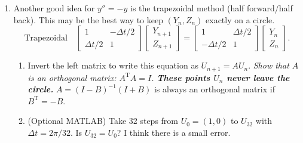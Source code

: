 \documentclass[14pt, a4paper]{article}
\begin{document}
\begin{enumerate}[resume]
    \item Another good idea for $y'' = -y$ is the trapezoidal method (half forward/half back). \textcolor{blue!60!green}{This may be the best way to keep $(Y_n, Z_n)$ exactly on a circle.}
          \[
              \text{Trapezoidal} \quad \begin{bmatrix} 1 & -\Delta t/2 \\ \Delta t/2 & 1 \end{bmatrix} \begin{bmatrix} Y_{n+1} \\ Z_{n+1} \end{bmatrix} = \begin{bmatrix} 1 & \Delta t/2 \\ -\Delta t/2 & 1 \end{bmatrix} \begin{bmatrix} Y_n \\ Z_n \end{bmatrix} .
          \]
          \begin{enumerate}
              \item Invert the left matrix to write this equation as $U_{n+1} = AU_n$. \textit{Show that $A$ is an orthogonal matrix: $A^{\mathrm{T}}A = I$. \textbf{These points $U_n$ never leave the circle.}} $A = (I - B)^{-1}(I + B)$ is always an orthogonal matrix if $B^{\mathrm{T}} = -B$.
              \item (Optional MATLAB) Take 32 steps from $U_0 = (1, 0)$ to $U_{32}$ with $\Delta t = 2\pi/32$. Is $U_{32} = U_0$? I think there is a small error.
          \end{enumerate}


\end{enumerate}
\end{document}
